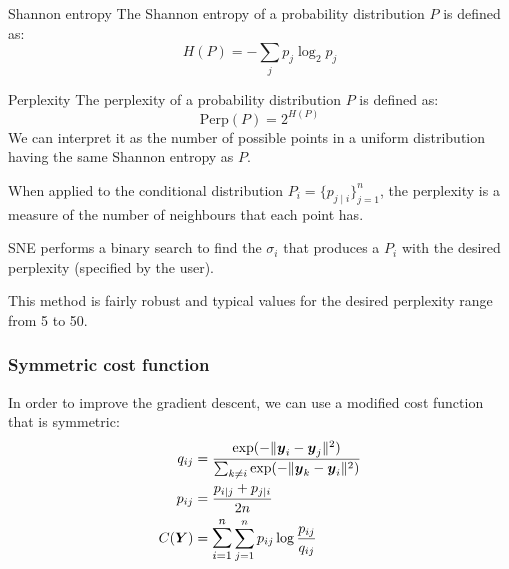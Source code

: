 \begin{definition}{Shannon entropy}{}
	The Shannon entropy of a probability distribution $P$ is defined as:
	\begin{equation*}
		H(P) = - \sum_{j} p_j \log_2 p_j
	\end{equation*}
\end{definition}

\begin{definition}{Perplexity}{}
	The perplexity of a probability distribution $P$ is defined as:
	\begin{equation*}
		\text{Perp}(P) = 2^{H(P)}
	\end{equation*}
	\tcblower
	We can interpret it as the number of possible points in a uniform
	distribution having the same Shannon entropy as $P$.
	\tcbline
	\begin{note}
		When applied to the conditional distribution $P_i = \{p_{j\mid i}\}^n_{j=1}$,
		the perplexity is a measure of the number of neighbours that each point has.
	\end{note}

\end{definition}

\begin{marker}
	SNE performs a binary search to find the $\sigma_i$ that produces a
	$P_i$ with the desired perplexity (specified by the user).
\end{marker}

This method is fairly robust and typical values for the desired perplexity
range from 5 to 50.

\subsubsection{Symmetric cost function}
In order to improve the gradient descent, we can use a modified cost function
that is symmetric:
\begin{align*}
	q_{ij}           & = \frac{\exp(-\lVert \boldsymbol y_i - \boldsymbol y_j \rVert^2)}{\sum_{k \neq i} \exp(-\lVert \boldsymbol y_k - \boldsymbol y_i \rVert^2)} \\
	p_{ij}           & = \frac{p_{i \mid j} + p_{j \mid i}}{2n}                                                                                                    \\
	C(\boldsymbol Y) & =
	\mathlarger{\sum_{i=1}^n} \sum_{j=1}^n p_{ij} \log \frac{p_{ij}}{q_{ij}}
\end{align*}

